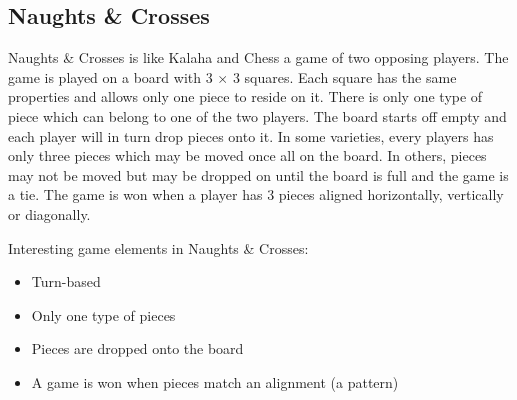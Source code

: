 \subsection{Naughts \& Crosses}

Naughts \& Crosses is like Kalaha and Chess a game of two opposing players. The game is played on a board with 3 $\times$ 3 squares. Each square has the same properties and allows only one piece to reside on it. There is only one type of piece which can belong to one of the two players. The board starts off empty and each player will in turn drop pieces onto it. In some varieties, every players has only three pieces which may be moved once all on the board. In others, pieces may not be moved but may be dropped on until the board is full and the game is a tie. The game is won when a player has 3 pieces aligned horizontally, vertically or diagonally. 

Interesting game elements in Naughts \& Crosses:
\begin{itemize}[noitemsep]
	\item Turn-based
	\item Only one type of pieces
	\item Pieces are dropped onto the board
	\item A game is won when pieces match an alignment (a pattern) 
\end{itemize}